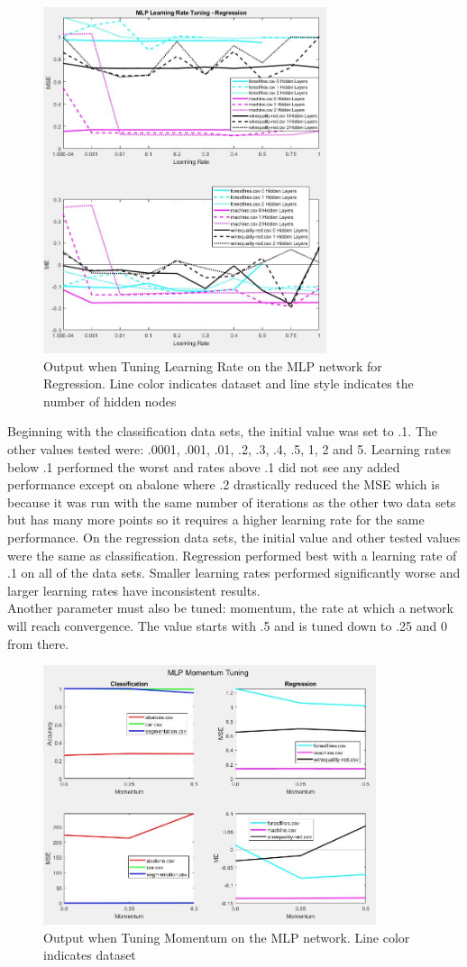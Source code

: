\documentclass[twoside,10pt]{article}
\begin{document}
\begin{figure}[h]
	\centering
	\includegraphics[height=4in]{FINAL_FIGS/MLP_LR_TUNING_REG.JPG}
	\caption{Output when Tuning Learning Rate on the MLP network for Regression. Line color indicates dataset and line style indicates the number of hidden nodes}
\end{figure}
Beginning with the classification data sets, the initial value was set to .1. The other values tested were: .0001, .001, .01, .2, .3, .4, .5, 1, 2 and 5. Learning rates below .1 performed the worst and rates above .1 did not see any added performance except on abalone where .2 drastically reduced the MSE which is because it was run with the same number of iterations as the other two data sets but has many more points so it requires a higher learning rate for the same performance.
On the regression data sets, the initial value and other tested values were the same as classification. Regression performed best with a learning rate of .1 on all of the data sets. Smaller learning rates performed significantly worse and larger learning rates have inconsistent results. \\
Another parameter must also be tuned: momentum, the rate at which a network will reach convergence. The value starts with .5 and is tuned down to .25 and 0 from there. \\
\begin{figure}[h]
	\centering
	\includegraphics[height=3in]{FINAL_FIGS/MLP_MOMENTUM.JPG}
	\caption{Output when Tuning Momentum on the MLP network. Line color indicates dataset}
\end{figure}
\end{document}
